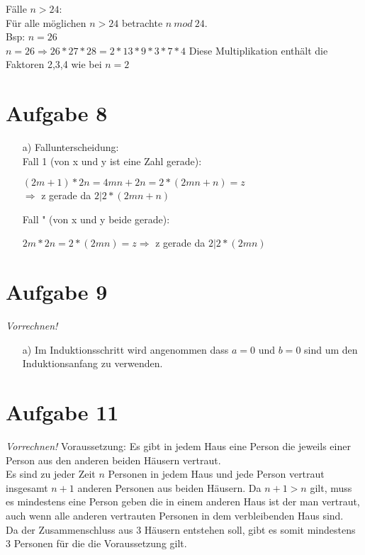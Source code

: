 \documentclass[paper = a4, ngerman]{scrartcl}
\begin{document}
\begin{itemize}
			Fälle $n>24$:\\
				Für alle möglichen $n>24$ betrachte $n\ mod\ 24$.\\
				Bsp: $n=26$\\
				$n=26 \Rightarrow 26*27*28 = 2*13*9*3*7*4$
				Diese Multiplikation enthält die Faktoren 2,3,4 wie bei $n=2$
		\end{itemize}
	
	
	\section*{Aufgabe 8}
		\begin{itemize}
			\item[a)] Fallunterscheidung:\\
			Fall 1 (von x und y ist eine Zahl gerade):
			\begin{center}
				$(2m + 1) * 2n = 4mn + 2n = 2*(2mn + n) = z $\\$\Rightarrow$ z gerade da $2|2*(2mn + n)$
			\end{center}
			Fall " (von x und y beide gerade):
			\begin{center}
				$2m * 2n = 2*(2mn) = z \Rightarrow$ z gerade da $2|2*(2mn)$
			\end{center}
		\end{itemize}
	
	
	\section*{Aufgabe 9}
	\textit{Vorrechnen!}
		\begin{itemize}
			\item[a)] Im Induktionsschritt wird angenommen dass $a=0$ und $b=0$ sind um den Induktionsanfang zu verwenden.
		\end{itemize}
	

\pagebreak
	\section*{Aufgabe 11}
		\textit{Vorrechnen!}
		Voraussetzung: Es gibt in jedem Haus eine Person die jeweils einer Person aus den anderen beiden Häusern vertraut.\\
		Es sind zu jeder Zeit $n$ Personen in jedem Haus und jede Person vertraut insgesamt $n+1$ anderen Personen aus beiden Häusern. Da $n+1 > n$ gilt, muss es mindestens eine Person geben die in einem anderen Haus ist der man vertraut, auch wenn alle anderen vertrauten Personen in dem verbleibenden Haus sind.\\
		Da der Zusammenschluss aus 3 Häusern entstehen soll, gibt es somit mindestens 3 Personen für die die Voraussetzung gilt.
\end{document}
